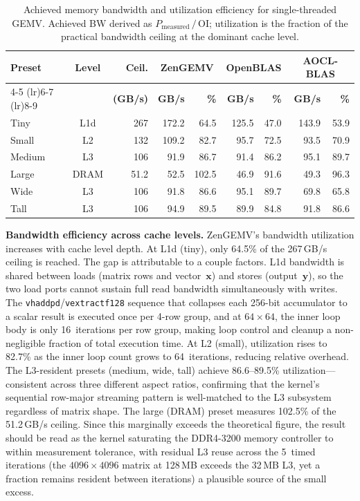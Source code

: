 \documentclass[conference]{IEEEtran}
\begin{document}
\begin{table}[tbp]
\centering
\caption{Achieved memory bandwidth and utilization efficiency for
single-threaded GEMV. Achieved BW derived as
$P_{\text{measured}}\,/\,$OI; utilization is the fraction of the
practical bandwidth ceiling at the dominant cache level.}
\label{tab:bw_util}
\begin{tabular}{@{}l c r rr rr rr@{}}
\toprule
\textbf{Preset} & \textbf{Level} & \textbf{Ceil.} &
  \multicolumn{2}{c}{\textbf{ZenGEMV}} &
  \multicolumn{2}{c}{\textbf{OpenBLAS}} &
  \multicolumn{2}{c}{\textbf{AOCL-BLAS}} \\
\cmidrule(lr){4-5} \cmidrule(lr){6-7} \cmidrule(lr){8-9}
 & & \textbf{(GB/s)} &
  \textbf{GB/s} & \textbf{\%} &
  \textbf{GB/s} & \textbf{\%} &
  \textbf{GB/s} & \textbf{\%} \\
\midrule
Tiny   & L1d  & 267  & 172.2 & 64.5 & 125.5 & 47.0 & 143.9 & 53.9 \\
Small  & L2   & 132  & 109.2 & 82.7 &  95.7 & 72.5 &  93.5 & 70.9 \\
Medium & L3   & 106  &  91.9 & 86.7 &  91.4 & 86.2 &  95.1 & 89.7 \\
Large  & DRAM & 51.2 &  52.5 & 102.5 & 46.9 & 91.6 &  49.3 & 96.3 \\
Wide   & L3   & 106  &  91.8 & 86.6 &  95.1 & 89.7 &  69.8 & 65.8 \\
Tall   & L3   & 106  &  94.9 & 89.5 &  89.9 & 84.8 &  91.8 & 86.6 \\
\bottomrule
\end{tabular}
\end{table}

\textbf{Bandwidth efficiency across cache levels.}
ZenGEMV's bandwidth utilization increases with cache level depth.
At L1d (tiny), only 64.5\% of the 267\,GB/s ceiling is reached.
The gap is attributable to a couple factors. L1d bandwidth is shared
between loads (matrix rows and vector~$\mathbf{x}$) and stores
(output~$\mathbf{y}$), so the two load ports cannot sustain full read
bandwidth simultaneously with writes.
The \texttt{vhaddpd}/\texttt{vextractf128} sequence that
collapses each 256-bit accumulator to a scalar result is executed once
per 4-row group, and at $64\times64$, the inner loop body is only
16~iterations per row group, making loop control and cleanup a
non-negligible fraction of total execution time.
At L2 (small), utilization rises to 82.7\% as the inner loop count
grows to 64~iterations, reducing relative overhead.
The L3-resident presets (medium, wide, tall) achieve 86.6--89.5\%
utilization---consistent across three different aspect ratios, confirming
that the kernel's sequential row-major streaming pattern is well-matched
to the L3 subsystem regardless of matrix shape.
The large (DRAM) preset measures 102.5\% of the 51.2\,GB/s ceiling.
Since this marginally exceeds the theoretical figure, the result should be
read as the kernel saturating the DDR4-3200 memory controller to within
measurement tolerance, with residual L3 reuse across the 5~timed iterations
(the $4096\times4096$ matrix at 128\,MB exceeds the 32\,MB L3, yet a fraction
remains resident between iterations) a plausible source of the small excess.
\end{document}
